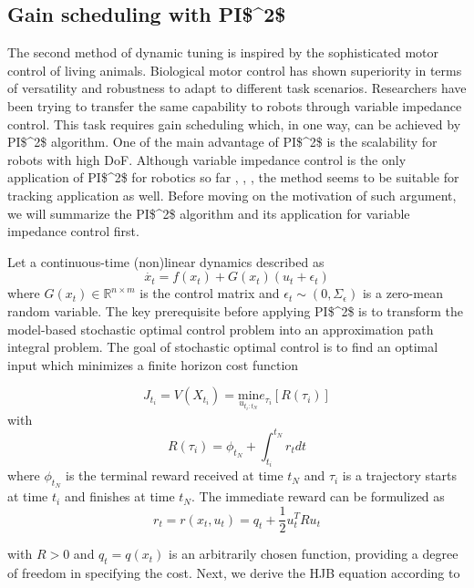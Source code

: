 \subsection{Gain scheduling with \ac{PI$^2$}}
The second method of dynamic tuning is inspired by the sophisticated motor control of living animals. Biological motor control has shown superiority in terms of versatility and robustness to adapt to different task scenarios. Researchers have been trying to transfer the same capability to robots through variable impedance control. This task requires gain scheduling which, in one way, can be achieved by \ac{PI$^2$} algorithm. One of the main advantage of \ac{PI$^2$} is the scalability for robots with high \ac {DoF}. Although variable impedance control is the only application of \ac{PI$^2$} for robotics so far \cite{Buchli2010}, \cite{Buchli6037312}, \cite{buchli2011learning}, the method seems to be suitable for tracking application as well. Before moving on the motivation of such argument, we will summarize the \ac{PI$^2$} algorithm and its application for variable impedance control first.    

Let a continuous-time (non)linear dynamics described as 
\begin{equation}
\dot{x_t} = f(x_t) + G(x_t)(u_t + \epsilon_t)
\end{equation}
where $ G(x_t) \in \mathbb{R}^{n \times m }$ is the control matrix and $ \epsilon_t  \sim (0, \Sigma_{\epsilon}) $ is a zero-mean random variable. The key prerequisite before applying \ac{PI$^2$} is to transform the model-based stochastic optimal control problem into an approximation path integral problem. The goal of stochastic optimal control is to find an optimal input which minimizes a finite horizon cost function

\begin{equation}
J_{t_i} = V(X_{t_i}) = \underset{u_{t_i:t_N}}{\text{min}} e_{\tau_i}[R(\tau_i)]
\end{equation}
with 
\begin{equation}
R(\tau_i) = \phi_{t_N} + \int_{t_i}^{t_N}r_t dt
\end{equation}
where $ \phi_{t_N} $ is the terminal reward received at time $ t_N $ and $ \tau_i $ is a trajectory starts at time $ t_i $ and finishes at time $ t_N $. The immediate reward can be formulized as
\begin{equation}
r_t = r(x_t, u_t) = q_t + \frac{1}{2}u_t^TRu_t
\end{equation}

with $R>0$ and $q_t = q(x_t) $ is an arbitrarily chosen function, providing a degree of freedom in specifying the cost. Next, we derive the \ac {HJB} equation according to  \cite{stengel1994}

